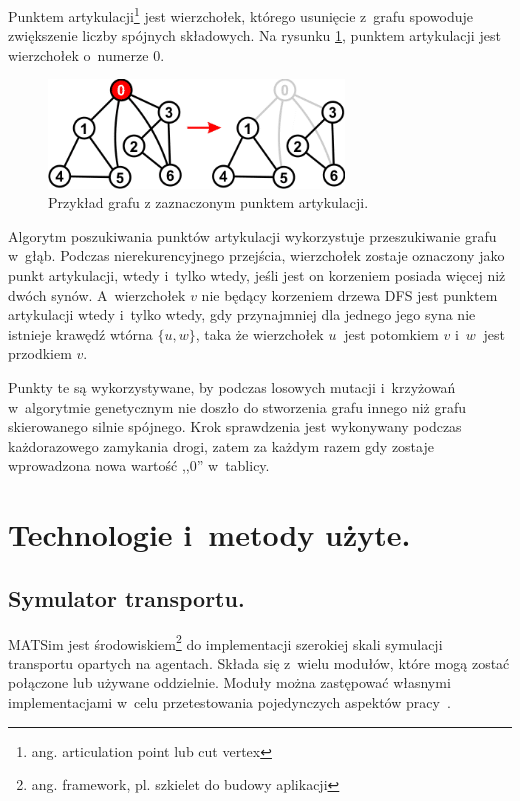 \documentclass[twoside,12pt]{report}
\let\oldsection\chapter
\def\chapter{\cleardoublepage\oldsection}
\begin{document}
Punktem artykulacji\footnote{ang. articulation point lub cut vertex} jest wierzchołek, którego usunięcie z~grafu spowoduje zwiększenie liczby spójnych składowych. Na rysunku \ref{artykulacja}, punktem artykulacji jest wierzchołek o~numerze $0$.

\begin{figure}[ht]
\begin{center}
\includegraphics[width=0.7\textwidth]{img/articulation}
\caption{Przykład grafu z zaznaczonym punktem artykulacji.}
\label{artykulacja}
\end{center}
\end{figure}

Algorytm poszukiwania punktów artykulacji wykorzystuje przeszukiwanie grafu w~głąb. Podczas nierekurencyjnego przejścia, wierzchołek zostaje oznaczony jako punkt artykulacji, wtedy i~tylko wtedy, jeśli jest on korzeniem posiada więcej niż dwóch synów. A~wierzchołek $ v $ nie będący korzeniem drzewa DFS jest punktem artykulacji wtedy i~tylko wtedy, gdy przynajmniej dla jednego jego syna nie istnieje krawędź wtórna $ \{u,w\} $, taka że wierzchołek $ u~$ jest potomkiem $ v $ i~$ w~$ jest przodkiem $ v $.

Punkty te są wykorzystywane, by podczas losowych mutacji i~krzyżowań w~algorytmie genetycznym nie doszło do stworzenia grafu innego niż grafu skierowanego silnie spójnego. Krok sprawdzenia jest wykonywany podczas każdorazowego zamykania drogi, zatem za każdym razem gdy zostaje wprowadzona nowa wartość ,,$0$'' w~tablicy.

\chapter{Technologie i~metody użyte.}\label{rozdz.technologie} 
\section{Symulator transportu.}

MATSim jest środowiskiem\footnote{ang. framework, pl. szkielet do budowy aplikacji} do implementacji szerokiej skali symulacji transportu opartych na agentach. Składa się z~wielu modułów, które mogą zostać połączone lub używane oddzielnie. Moduły można zastępować własnymi implementacjami w~celu przetestowania pojedynczych aspektów pracy~\cite{matsim}.
\end{document}
